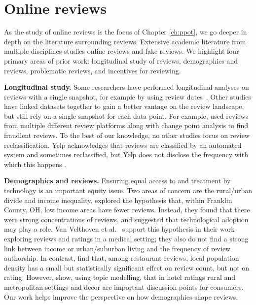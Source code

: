 \section{Online reviews} \label{sec:rim:related_work}


As the study of online reviews is the focus of Chapter \ref{ch:ppot}, we go deeper in depth on the literature surrounding reviews. Extensive academic literature from multiple disciplines studies online reviews and fake reviews. We highlight four primary areas of prior work: longitudinal study of reviews, demographics and reviews, problematic reviews, and incentives for reviewing.

\textbf{Longitudinal study.} Some researchers have performed longitudinal analyses on reviews with a single snapshot, for example by using review dates~\cite{bakhshi2014demographics,ye2016temporal,wang2017temporal}.  Other studies have linked datasets together to gain a better vantage on the review landscape, but still rely on a single snapshot for each data point. For example, \citet{nilizadeh2019think} used reviews from multiple different review platforms along with change point analysis to find fraudlent reviews. To the best of our knowledge, no other studies focus on review reclassification. Yelp acknowledges that reviews are classified by an automated system and sometimes reclassified, but Yelp does not disclose the frequency with which this happens \cite{yelpwhyrec,yelpwhychange}.

\textbf{Demographics and reviews.} Ensuring equal access to and treatment by technology is an important equity issue. Two areas of concern are the rural/urban divide and income inequality. \citet{baginski2014exploring} explored the hypothesis that, within Franklin County, OH, low income areas have fewer reviews. Instead, they found that there were strong concentrations of reviews, and suggested that technological adoption may play a role. Van Velthoven et al.~\cite{van2018cross} support this hypothesis in their work exploring reviews and ratings in a medical setting; they also do not find a strong link between income or urban/suburban living and the frequency of review authorship. In contrast, \citet{bakhshi2014demographics} find that, among restaurant reviews, local population density has a small but statistically significant effect on review count, but not on rating.  However, \citet{sutherland2020topic} show, using topic modelling, that in hotel ratings rural and metropolitan settings and decor are important discussion points for consumers. Our work helps improve the perspective on how demographics shape reviews.

